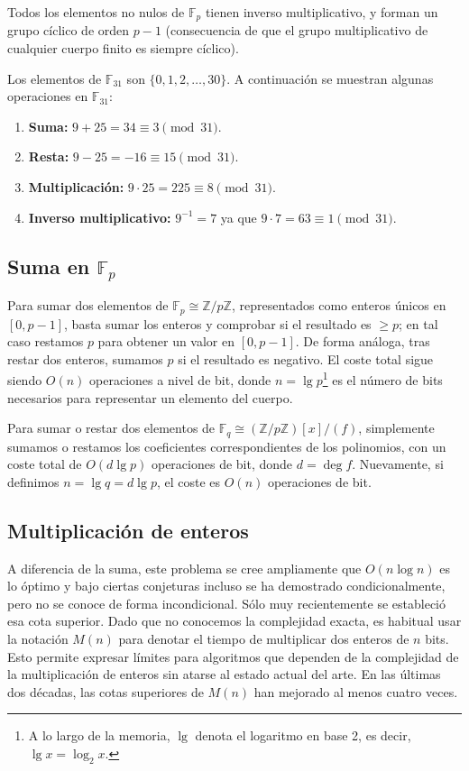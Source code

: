 Todos los elementos no nulos de $\mathbb{F}_p$ tienen inverso multiplicativo, y forman un grupo cíclico de orden $p-1$ (consecuencia de que el grupo multiplicativo de cualquier cuerpo finito es siempre cíclico).

\begin{ejemplo}\label{ej:F31}
Los elementos de $\mathbb{F}_{31}$ son $\{0,1,2,\dots,30\}$. A continuación se muestran algunas operaciones en $\mathbb{F}_{31}$:
\begin{enumerate}
  \item \textbf{Suma:} $9 + 25 = 34 \equiv 3 \pmod{31}.$
  \item \textbf{Resta:} $9 - 25 = -16 \equiv 15 \pmod{31}.$
  \item \textbf{Multiplicación:} $9 \cdot 25 = 225 \equiv 8 \pmod{31}.$
  \item \textbf{Inverso multiplicativo:} $9^{-1} = 7$ ya que $9 \cdot 7 = 63 \equiv 1 \pmod{31}.$
\end{enumerate}
\end{ejemplo}

\subsection{Suma en \texorpdfstring{$\mathbb{F}_p$}{Fp}}
Para sumar dos elementos de \(\mathbb{F}_p\cong\mathbb{Z}/p\mathbb{Z}\), representados como enteros únicos en \([0,p-1]\), basta sumar los enteros y comprobar si el resultado es \(\ge p\); en tal caso restamos \(p\) para obtener un valor en \([0,p-1]\). De forma análoga, tras restar dos enteros, sumamos \(p\) si el resultado es negativo. El coste total sigue siendo \(O(n)\) operaciones a nivel de bit, donde \(n=\lg p\)\footnote{A lo largo de la memoria, \(\lg\) denota el logaritmo en base 2, es decir, \(\lg x = \log_2 x\).} es el número de bits necesarios para representar un elemento del cuerpo.

Para sumar o restar dos elementos de \(\mathbb{F}_q\cong(\mathbb{Z}/p\mathbb{Z})[x]/(f)\), simplemente sumamos o restamos los coeficientes correspondientes de los polinomios, con un coste total de \(O(d\lg p)\) operaciones de bit, donde \(d=\deg f\). Nuevamente, si definimos \(n=\lg q=d\lg p\), el coste es \(O(n)\) operaciones de bit.

\subsection{Multiplicación de enteros}
A diferencia de la suma, este problema se cree ampliamente que \(O(n\log n)\) es lo óptimo y bajo ciertas conjeturas incluso se ha demostrado condicionalmente, pero no se conoce de forma incondicional. Sólo muy recientemente se estableció esa cota superior. Dado que no conocemos la complejidad exacta, es habitual usar la notación \(M(n)\) para denotar el tiempo de multiplicar dos enteros de \(n\) bits. Esto permite expresar límites para algoritmos que dependen de la complejidad de la multiplicación de enteros sin atarse al estado actual del arte. En las últimas dos décadas, las cotas superiores de \(M(n)\) han mejorado al menos cuatro veces.

